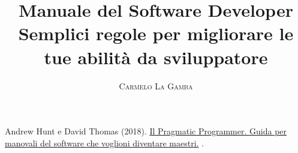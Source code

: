 \documentclass[twoside,onecolumn]{article}
\title{Manuale del Software Developer  \large Semplici regole per migliorare le tue abilità da sviluppatore}
\author{
	\textsc{Carmelo La Gamba}\\[1ex]
	\normalsize
	\href{https://carmelolg.github.io/}{\faicon{github}}
	\href{https://t.me/carmelolg}{\faicon{paper-plane}}
}
\date{} %
\begin{document}
\maketitle


\newpage


\newpage


\newpage



\newpage


\begin{thebibliography}{99} %

Andrew Hunt e David Thomas (2018).
\newblock \href{https://www.amazon.it/dp/8850332548/ref=cm_sw_em_r_mt_dp_AvYCFbNVMFA1X}{Il Pragmatic Programmer. Guida per manovali del software che voglioni diventare maestri.}
.
 
\end{thebibliography}

\end{document}
